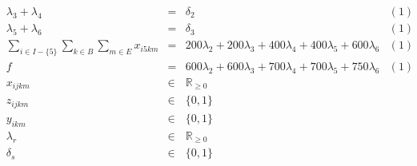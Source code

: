 \documentclass[a4paper,oneside,12pt]{amsart}
\def \ds{\displaystyle}
\begin{document}
\[\begin{array}{rrclr}
     & \lambda_3 + \lambda_4 & = & \delta_2 &  (1) \\
     & \lambda_5 + \lambda_6 & = & \delta_3 &  (1) \\
     & \ds\sum_{i\in I-\{5\}}\sum_{k\in B}\sum_{m\in E} x_{i5km} & = & 200\lambda_2 + 200\lambda_3 + 400\lambda_4 + 400\lambda_5 + 600\lambda_6 &  (1)  \\
     & f & = & 600\lambda_2 + 600\lambda_3 + 700\lambda_4 + 700\lambda_5 + 750\lambda_6 & (1) \\
     & x_{ijkm} & \in & \mathbb{R}_{\geq 0} & \\
     & z_{ijkm} & \in & \{0,1\} & \\
     & y_{ikm} & \in & \{0,1\} & \\
     & \lambda_r & \in & \mathbb{R}_{\geq 0} & \\
     & \delta_s & \in & \{0,1\} & \\
\end{array}
\]
\end{document}
